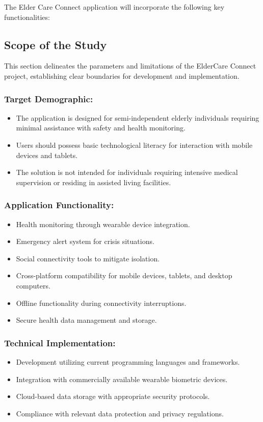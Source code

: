 The Elder Care Connect application will incorporate the following key functionalities:


\subsection{Scope of the Study}

This section delineates the parameters and limitations of the ElderCare Connect project, establishing clear boundaries for development and implementation.

\subsubsection*{Target Demographic:}
\begin{itemize}
    \item The application is designed for semi-independent elderly individuals requiring minimal assistance with safety and health monitoring.
    \item Users should possess basic technological literacy for interaction with mobile devices and tablets.
    \item The solution is not intended for individuals requiring intensive medical supervision or residing in assisted living facilities.
\end{itemize}

\subsubsection*{Application Functionality:}
\begin{itemize}
    \item Health monitoring through wearable device integration.
    \item Emergency alert system for crisis situations.
    \item Social connectivity tools to mitigate isolation.
    \item Cross-platform compatibility for mobile devices, tablets, and desktop computers.
    \item Offline functionality during connectivity interruptions.
    \item Secure health data management and storage.
\end{itemize}

\subsubsection*{Technical Implementation:}
\begin{itemize}
    \item Development utilizing current programming languages and frameworks.
    \item Integration with commercially available wearable biometric devices.
    \item Cloud-based data storage with appropriate security protocols.
    \item Compliance with relevant data protection and privacy regulations.
\end{itemize}

